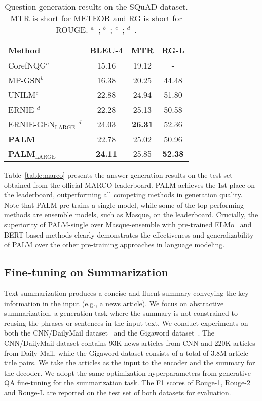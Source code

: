 \documentclass[11pt,a4paper]{article}
\newcommand{\method}{PALM\xspace}
\begin{document}
\begin{table}[b!]
\vspace{-5pt}
\center
\begin{tabular}{ l | c | c | c}
\hline\hline
{\textbf{Method}} & \textbf{BLEU-4} & \textbf{MTR} & \textbf{RG-L} \\
\hline\hline
CorefNQG$^a$ & 15.16  & 19.12 & - \\
MP-GSN$^b$ & 16.38 & 20.25 & 44.48 \\
UNILM$^c$ & 22.88 & 24.94 & 51.80 \\
ERNIE $^d$ & 22.28 & 25.13 & 50.58  \\
ERNIE-GEN$_{\text{LARGE}}$ $^d$ & 24.03 & \textbf{26.31} & 52.36 \\
\hline
\textbf{\method} & 22.78 & 25.02 & 50.96 \\
\textbf{\method}$_{\text{LARGE}}$ & \textbf{24.11} & 25.85 & \textbf{52.38} \\
\hline\hline
\end{tabular}
\caption{Question generation results on the SQuAD
dataset. MTR is short for METEOR and RG is short for ROUGE. $^a$~\cite{corefnqg}; $^b$~\cite{zhao-etal-2018-paragraph}; $^c$~\cite{unilm2019}; $^d$~\cite{ernie-gen}.}
\label{table:squad}
\end{table}

Table~\ref{table:marco} presents the answer generation results on the test set obtained from the official MARCO leaderboard. \method achieves the 1st place on the leaderboard, outperforming all competing methods in generation quality. Note that \method pre-trains a single model, while some of the top-performing methods are ensemble models, such as Masque, on the leaderboard. Crucially, the superiority of \method-single over Masque-ensemble with pre-trained ELMo~\cite{peters-etal-2018-deep} and BERT-based methods clearly demonstrates the effectiveness and generalizability of \method over the other pre-training approaches in language modeling.

\subsection{Fine-tuning on Summarization}
Text summarization produces a concise and fluent summary conveying the key information in the input (e.g., a news article). We focus on abstractive summarization, a generation task where the summary is not constrained to reusing the phrases or sentences in the input text. We conduct experiments on both the CNN/DailyMail dataset~\cite{karl2015teaching} and the Gigaword dataset~\cite{gigaword}. The CNN/DailyMail dataset contains 93K news articles from CNN and 220K articles from Daily Mail, while the Gigaword dataset consists of a total of 3.8M article-title pairs. We take the articles as the input to the encoder and the summary for the decoder. We adopt the same optimization hyperparameters from generative QA fine-tuning for the summarization task. The F1 scores of Rouge-1, Rouge-2 and Rouge-L are reported on the test set of both datasets for evaluation.
\end{document}
